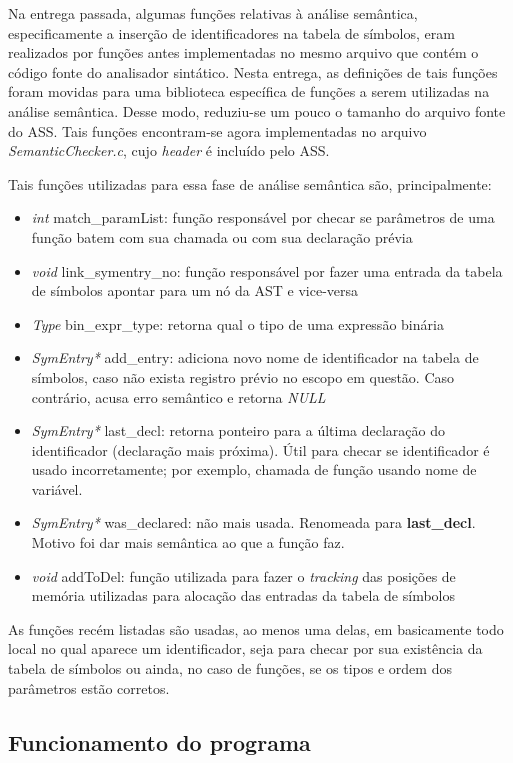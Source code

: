 \documentclass[
	article,			%
	11pt,				%
	oneside,			%
	a4paper,			%
	english,			%
	brazil,				%
	sumario=tradicional
	]{abntex2}
\renewcommand{\it}[1]{\textit{#1}}
\renewcommand{\bf}[1]{\textbf{#1}}
\begin{document}
Na entrega passada, algumas funções relativas à análise semântica, especificamente a inserção de identificadores na tabela de símbolos, eram realizados por funções antes implementadas no mesmo arquivo que contém o código fonte do analisador sintático. Nesta entrega, as definições de tais funções foram movidas para uma biblioteca específica de funções a serem utilizadas na análise semântica. Desse modo, reduziu-se um pouco o tamanho do arquivo fonte do ASS. Tais funções encontram-se agora implementadas no arquivo \it{SemanticChecker.c}, cujo \it{header} é incluído pelo ASS.

Tais funções utilizadas para essa fase de análise semântica são, principalmente:

\begin{itemize}
	\item \it{int} match\_paramList: função responsável por checar se parâmetros de uma função batem com sua chamada ou com sua declaração prévia
	\item \it{void} link\_symentry\_no: função responsável por fazer uma entrada da tabela de símbolos apontar para um nó da AST e vice-versa
	\item \it{Type} bin\_expr\_type: retorna qual o tipo de uma expressão binária
	\item \it{SymEntry*} add\_entry: adiciona novo nome de identificador na tabela de símbolos, caso não exista registro prévio no escopo em questão. Caso contrário, acusa erro semântico e retorna \it{NULL}
	\item \it{SymEntry*} last\_decl: retorna ponteiro para a última declaração do identificador (declaração mais próxima). Útil para checar se identificador é usado incorretamente; por exemplo, chamada de função usando nome de variável.
  \item	\it{SymEntry*} was\_declared: não mais usada. Renomeada para \bf{last\_decl}. Motivo foi dar mais semântica ao que a função faz.
	\item \it{void} addToDel: função utilizada para fazer o \it{tracking} das posições de memória utilizadas para alocação das entradas da tabela de símbolos
\end{itemize}

As funções recém listadas são usadas, ao menos uma delas, em basicamente todo local no qual aparece um identificador, seja para checar por sua existência da tabela de símbolos ou ainda, no caso de funções, se os tipos e ordem dos parâmetros estão corretos.

\subsection{Funcionamento do programa}
\end{document}
